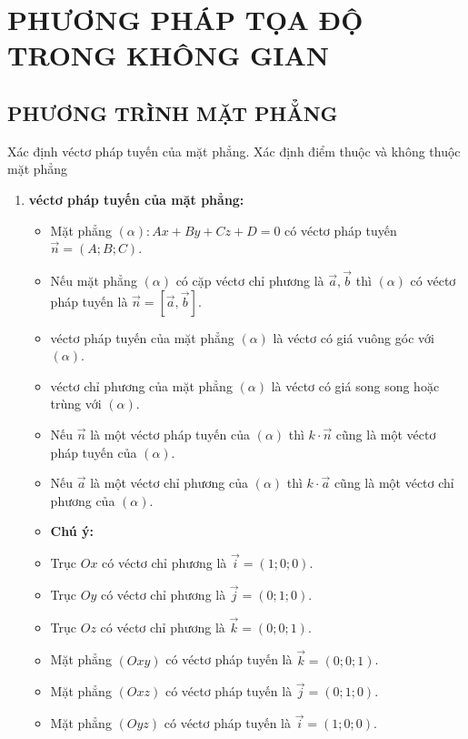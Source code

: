 \chapter{PHƯƠNG PHÁP TỌA ĐỘ TRONG KHÔNG GIAN}
\section{PHƯƠNG TRÌNH MẶT PHẲNG}
\begin{dang}{Xác định véctơ pháp tuyến của mặt phẳng. Xác định điểm thuộc và không thuộc mặt phẳng}
	\begin{enumerate}[label=\bf\arabic*.]
	\item \textbf{véctơ pháp tuyến của mặt phẳng:}
	\begin{itemize}
		\item Mặt phẳng $(\alpha)\colon A x+B y+C z+D=0$ có véctơ pháp tuyến $\overrightarrow{n}=(A; B; C)$.
		\item Nếu mặt phẳng $(\alpha)$ có cặp véctơ chỉ phương là $\overrightarrow{a}, \overrightarrow{b}$ thì $(\alpha)$ có véctơ pháp tuyến là $\overrightarrow{n}=\left[\overrightarrow{a}, \overrightarrow{b}\right]$.
		\item véctơ pháp tuyến của mặt phẳng $(\alpha)$ là véctơ có giá vuông góc với $(\alpha)$.
		\item véctơ chỉ phương của mặt phẳng $(\alpha)$ là véctơ có giá song song hoặc trùng với $(\alpha)$.
		\item Nếu $\overrightarrow{n}$ là một véctơ pháp tuyến của $(\alpha)$ thì $k \cdot \overrightarrow{n}$ cũng là một véctơ pháp tuyến của $(\alpha)$.
		\item Nếu $\overrightarrow{a}$ là một véctơ chỉ phương của $(\alpha)$ thì $k \cdot \overrightarrow{a}$ cũng là một véctơ chỉ phương của $(\alpha)$.
		\item[] \textbf{Chú ý:}
		\item Trục $O x$ có véctơ chỉ phương là $\overrightarrow{i}=(1; 0; 0)$.
		\item Trục $O y$ có véctơ chỉ phương là $\overrightarrow{j}=(0; 1; 0)$.
		\item Trục $O z$ có véctơ chỉ phương là $\overrightarrow{k}=(0; 0; 1)$.
		\item Mặt phẳng $(O x y)$ có véctơ pháp tuyến là $\overrightarrow{k}=(0; 0; 1)$.
		\item Mặt phẳng $(O x z)$ có véctơ pháp tuyến là $\overrightarrow{j}=(0; 1; 0)$.
		\item Mặt phẳng $(O y z)$ có véctơ pháp tuyến là $\overrightarrow{i}=(1; 0; 0)$.

\end{itemize}
\end{enumerate}
\end{dang}
